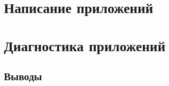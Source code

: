 \documentclass[11pt, oneside]{book}   	%
\begin{document}





\clearpage
\setcounter{page}{1}

\tableofcontents

\listoffigures

\hypersetup{linkcolor=violet}



\part{Написание приложений}
\label{part:writing-applications}



\part{Диагностика приложений}
\label{part:diagnosing-applictions}















\chapter*{Выводы}
\end{document}
